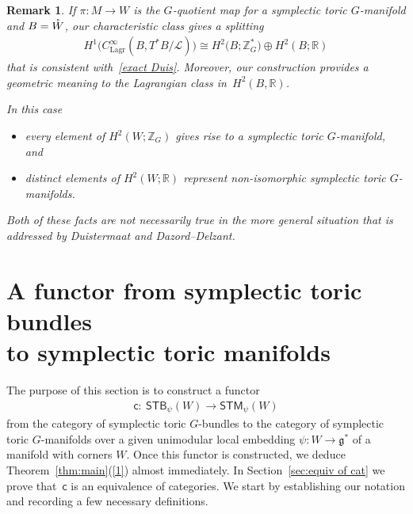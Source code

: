 \documentclass[10pt,a4paper]{amsart}
\numberwithin{equation}{section}
\newtheorem{Remark}[Lemma]{Remark}
\begin{document}
\begin{Remark}\label{rmrk:1.11}
If $\pi \colon M \to W$ is the $G$-quotient map for a symplectic toric
$G$-manifold and $B = {\mathaccent23{W}}$, our characteristic class gives a splitting
\begin{gather*}
 H^1\big(C^{\infty}_{\text{Lagr}}(B,T^*B/{\mathcal L})\big) \cong H^2\big(B;{\mathbb Z}_G^*\big) \oplus H^2(B;{\mathbb R})
\end{gather*}
that is consistent with~\eqref{exact Duis}.
Moreover, our construction
provides a geometric meaning to the Lagrangian class in~$H^2(B,{\mathbb R})$.

In this case
\begin{itemize}\itemsep=0pt
\item
every element of $H^2(W;{\mathbb Z}_G)$ gives rise to a symplectic toric $G$-manifold,
and
\item
distinct elements of $H^2(W;{\mathbb R})$ represent non-isomorphic symplectic toric
$G$-manifolds.
\end{itemize}
Both of these facts are not necessarily true in the more general situation
that is addressed by Duistermaat and Dazord--Delzant.
\end{Remark}




\section{A functor from symplectic toric bundles\\ to symplectic toric manifolds}
\label{sec:collapse}

The purpose of this section is to construct a  functor
 \begin{gather*}
 {\textsf{c}} \colon \  {\textsf{STB}}_{\psi}(W)   \to
                   {\textsf{STM}}_{\psi}(W)
\end{gather*}
from the category of symplectic toric $G$-bundles to the category of
symplectic toric $G$-manifolds over a given unimodular local embedding
$\psi\colon W\to {\mathfrak g}^*$ of a manifold with corners $W$. Once this functor
is constructed, we deduce Theorem~\ref{thm:main}(\ref{1}) almost
immediately.  In Section~\ref{sec:equiv of cat} we  prove that~${\textsf{c}}$ is an equivalence of categories.  We start by establishing
our notation and recording a few necessary
def\/initions.
\end{document}
